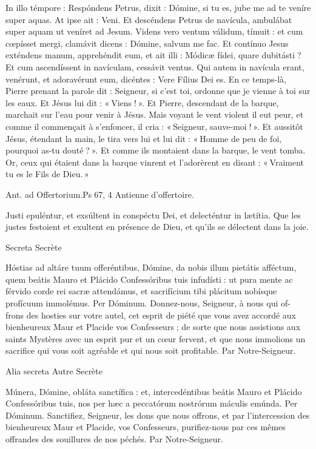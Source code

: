 \begin{paracol}{2}
\switchcolumn*

In illo témpore : Respóndens Petrus, dixit : Dómine, si tu es, jube me ad te veníre super aquas. At ipse ait : Veni. Et descéndens Petrus de navícula, ambulábat super aquam ut veníret ad Jesum. Videns vero ventum válidum, tímuit : et cum cœpísset mergi, clamávit dicens : Dómine, salvum me fac. Et contínuo Jesus exténdens manum, apprehéndit eum, et ait illi : Módicæ fídei, quare dubitásti ? Et cum ascendíssent in navículam, cessávit ventus. Qui autem in navícula erant, venérunt, et adoravérunt eum, dicéntes : Vere Fílius Dei es.
\switchcolumn
En ce temps-là, Pierre prenant la parole dit : Seigneur, si c’est toi, ordonne que je vienne à toi sur les eaux. Et Jésus lui dit : « Viens ! ». Et Pierre, descendant de la barque, marchait sur l’eau pour venir à Jésus. Mais voyant le vent violent il eut peur, et comme il commençait à s’enfoncer, il cria : « Seigneur, sauve-moi ! ». Et aussitôt Jésus, étendant la main, le tira vers lui et lui dit : « Homme de peu de foi, pourquoi as-tu douté ? ». Et comme ils montaient dans la barque, le vent tomba. Or, ceux qui étaient dans la barque vinrent et l’adorèrent en disant : « Vraiment tu es le Fils de Dieu. »
\switchcolumn*

Ant. ad Offertorium.\hfill Ps 67, 4
\switchcolumn
Antienne d’offertoire.
\switchcolumn*

Justi epuléntur, et exsúltent in conspéctu Dei, et delecténtur in lætítia.
\switchcolumn
Que les justes festoient et exultent en présence de Dieu, et qu’ils se délectent dans la joie.
\switchcolumn*

Secreta
\switchcolumn
Secrète
\switchcolumn*

Hóstias ad altáre tuum offeréntibus,  Dómine, da nobis illum pietátis afféctum, quem beátis Mauro et Plácido Confessóribus tuis infudísti : ut pura mente ac férvido corde rei sacræ attendámus, et sacrifícium tibi plácitum nobísque profícuum immolémus. Per Dóminum.
\switchcolumn
Donnez-nous, Seigneur, à nous qui of- frons des hosties sur votre autel, cet esprit de piété que vous avez accordé aux bienheureux Maur et Placide vos Confesseurs ; de sorte que nous assistions aux saints Mystères avec un esprit pur et un cœur fervent, et que nous immolions un sacrifice qui vous soit agréable et qui nous soit profitable. Par Notre-Seigneur.
\switchcolumn*

Alia secreta
\switchcolumn
Autre Secrète
\switchcolumn*

Múnera, Dómine, obláta sanctífica :  et, intercedéntibus beátis Mauro et Plácido Confessóribus tuis, nos per hæc a peccatórum nostrórum máculis emúnda. Per Dóminum.
\switchcolumn
Sanctifiez, Seigneur, les dons que nous  offrons, et par l’intercession des bienheureux Maur et Placide, vos Confesseurs, purifiez-nous par ces mêmes offrandes des souillures de nos péchés. Par Notre-Seigneur.
\switchcolumn*


\end{paracol}
